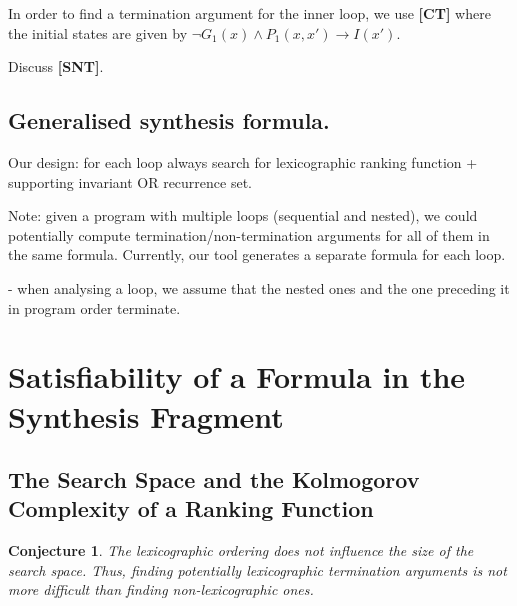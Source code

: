 \documentclass[preprint]{sigplanconf}
\newtheorem{conjecture}[theorem]{Conjecture}
\theoremstyle{definition}
\newtheorem{definition}[theorem]{Definition}
\begin{document}
In order to find a termination argument for the inner loop, we use {\bf [CT]} where the initial states are given by 
$\neg G_1(x) \wedge P_1(x,x') \rightarrow I(x')$.


Discuss {\bf [SNT]}.\\

\fi

\subsection{Generalised synthesis formula.}
Our design: for each loop always search for lexicographic ranking function + supporting invariant OR recurrence set.

Note: given a program with multiple loops (sequential and nested), we could potentially compute termination/non-termination 
arguments for all of them in the same formula. Currently, our tool generates a separate formula for each loop.

- when analysing a loop, we assume that the nested ones and the one preceding it in program order terminate.\\




\section{Satisfiability of a Formula in the Synthesis Fragment} \label{sec:synthesis}
%
\iffalse
\subsection{The Search Space and the Kolmogorov Complexity of a Ranking Function}
\begin{conjecture}
The lexicographic ordering does not influence the size of the search space. Thus, finding potentially lexicographic termination arguments is not more difficult than finding non-lexicographic ones.   
\end{conjecture}
\end{document}
